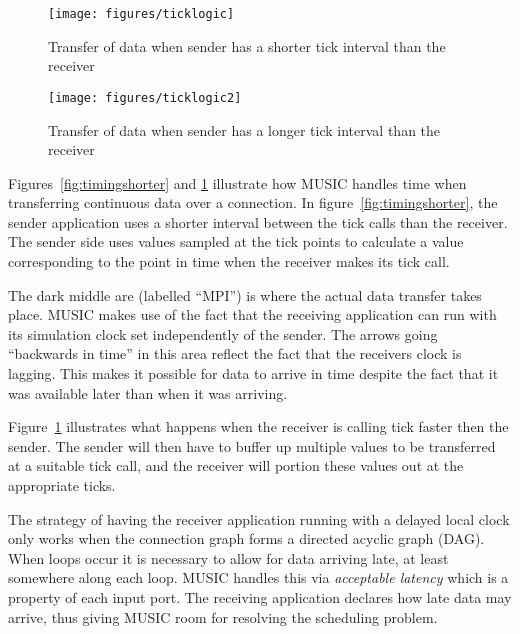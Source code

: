 \documentclass[a4paper]{report}
\begin{document}
\begin{figure}
  \begin{center}
    \begin{minipage}{0.45\textwidth}
      \texttt{[image: figures/ticklogic]}
      \caption[Timing of data transfer, slowdown]{\label{fig:timingshorter}
        Transfer of data when sender has a shorter
        tick interval than the receiver}
    \end{minipage}
    \hfill
    \begin{minipage}{0.45\textwidth}
      \texttt{[image: figures/ticklogic2]}
      \caption[Timing of data transfer, speedup]{\label{fig:timinglonger}
        Transfer of data when sender has a longer
        tick interval than the receiver}
    \end{minipage}
  \end{center}
\end{figure}

Figures~\ref{fig:timingshorter} and \ref{fig:timinglonger} illustrate
how MUSIC handles time when transferring continuous data over a connection.
In figure~\ref{fig:timingshorter}, the sender application uses a
shorter interval between the tick calls than the receiver.  The sender
side uses values sampled at the tick points to calculate a value
corresponding to the point in time when the receiver makes its tick
call.

The dark middle are (labelled ``MPI'') is where the actual data
transfer takes place.  MUSIC makes use of the fact that the receiving
application can run with its simulation clock set independently of the
sender.  The arrows going ``backwards in time'' in this area reflect
the fact that the receivers clock is lagging.  This makes it possible
for data to arrive in time despite the fact that it was available
later than when it was arriving.

Figure~\ref{fig:timinglonger} illustrates what happens when the
receiver is calling tick faster then the sender.  The sender will then
have to buffer up multiple values to be transferred at a suitable tick
call, and the receiver will portion these values out at the
appropriate ticks.

The strategy of having the receiver application running with a delayed
local clock only works when the connection graph forms a directed
acyclic graph (DAG).  When loops occur it is necessary to allow for
data arriving late, at least somewhere along each loop.  MUSIC handles
this via \emph{acceptable latency} which is a property of each input port.  The
receiving application declares how late data may arrive, thus giving
MUSIC room for resolving the scheduling problem.
\end{document}
